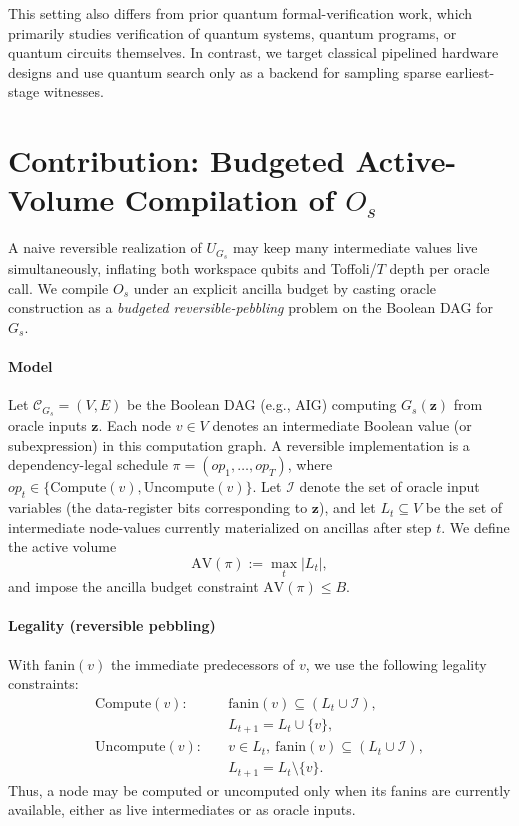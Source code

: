 \documentclass[conference]{IEEEtran}
\newcommand{\zvec}{\mathbf{z}}
\begin{document}
This setting also differs from prior quantum formal-verification work, which primarily studies verification of quantum systems, quantum programs, or quantum circuits themselves.\cite{ying2019modelchecking,feng2015qpmc,ying2021quantumcircuits} In contrast, we target classical pipelined hardware designs and use quantum search only as a backend for sampling sparse earliest-stage witnesses.

\section{Contribution: Budgeted Active-Volume Compilation of \texorpdfstring{$O_s$}{Os}}
A naive reversible realization of $U_{G_s}$ may keep many intermediate values live simultaneously, inflating both
workspace qubits and Toffoli/$T$ depth per oracle call. We compile $O_s$ under an explicit ancilla budget by casting
oracle construction as a \emph{budgeted reversible-pebbling} problem on the Boolean DAG for $G_s$.

\paragraph{Model}
Let $\mathcal{C}_{G_s}=(V,E)$ be the Boolean DAG (e.g., AIG) computing $G_s(\zvec)$ from oracle inputs $\zvec$.\cite{abc2010,dagaig2006}
Each node $v\in V$ denotes an intermediate Boolean value (or subexpression) in this computation graph.
A reversible implementation is a dependency-legal schedule
$\pi=(op_1,\ldots,op_T)$, where $op_t\in\{\mathrm{Compute}(v),\mathrm{Uncompute}(v)\}$.\cite{bennett1989timespace}
Let $\mathcal{I}$ denote the set of oracle input variables (the data-register bits corresponding to $\zvec$), and let
$L_t\subseteq V$ be the set of intermediate node-values currently materialized on ancillas after step $t$.
We define the active volume
\[
\mathrm{AV}(\pi):=\max_t |L_t|,
\]
and impose the ancilla budget constraint $\mathrm{AV}(\pi)\le B$.

\paragraph{Legality (reversible pebbling)}
With $\mathrm{fanin}(v)$ the immediate predecessors of $v$, we use the following legality constraints:\cite{MeuliSoekenSchmittMozafariDeMicheli2021ASPDAC,BhattacharjeeSoekenDuttaChattopadhyayDeMicheli2019DATE}
\[
\begin{aligned}
\mathrm{Compute}(v):\quad &\mathrm{fanin}(v)\subseteq (L_t\cup \mathcal{I}),\\
&L_{t+1}=L_t\cup\{v\},\\[2pt]
\mathrm{Uncompute}(v):\quad &v\in L_t,\ \mathrm{fanin}(v)\subseteq (L_t\cup \mathcal{I}),\\
&L_{t+1}=L_t\setminus\{v\}.
\end{aligned}
\]
Thus, a node may be computed or uncomputed only when its fanins are currently available, either as live intermediates or as oracle inputs.
\end{document}
